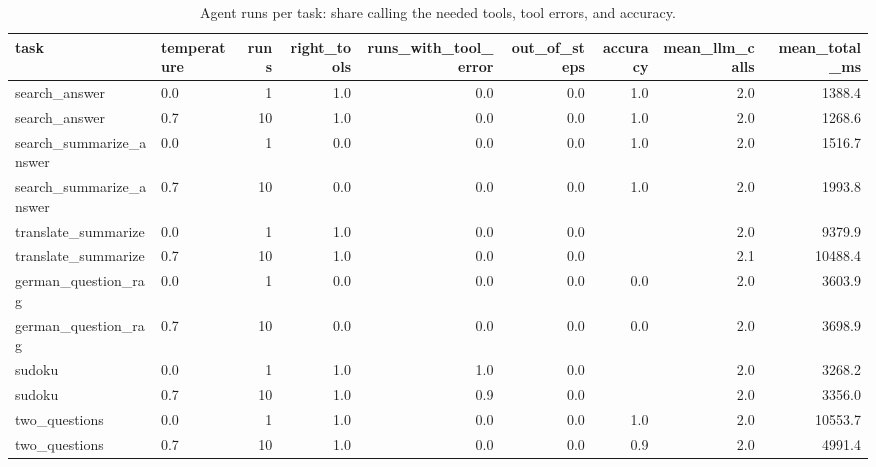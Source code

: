 \begin{table}[t]
\centering\small
\caption{Agent runs per task: share calling the needed tools, tool errors, and accuracy.}
\label{tab:agent_reliability}
\begin{tabular}{llrrrrrrr}
\toprule
task & temperature & runs & right\_tools & runs\_with\_tool\_error & out\_of\_steps & accuracy & mean\_llm\_calls & mean\_total\_ms \\
\midrule
search\_answer & 0.0 & 1 & 1.0 & 0.0 & 0.0 & 1.0 & 2.0 & 1388.4 \\
search\_answer & 0.7 & 10 & 1.0 & 0.0 & 0.0 & 1.0 & 2.0 & 1268.6 \\
search\_summarize\_answer & 0.0 & 1 & 0.0 & 0.0 & 0.0 & 1.0 & 2.0 & 1516.7 \\
search\_summarize\_answer & 0.7 & 10 & 0.0 & 0.0 & 0.0 & 1.0 & 2.0 & 1993.8 \\
translate\_summarize & 0.0 & 1 & 1.0 & 0.0 & 0.0 &  & 2.0 & 9379.9 \\
translate\_summarize & 0.7 & 10 & 1.0 & 0.0 & 0.0 &  & 2.1 & 10488.4 \\
german\_question\_rag & 0.0 & 1 & 0.0 & 0.0 & 0.0 & 0.0 & 2.0 & 3603.9 \\
german\_question\_rag & 0.7 & 10 & 0.0 & 0.0 & 0.0 & 0.0 & 2.0 & 3698.9 \\
sudoku & 0.0 & 1 & 1.0 & 1.0 & 0.0 &  & 2.0 & 3268.2 \\
sudoku & 0.7 & 10 & 1.0 & 0.9 & 0.0 &  & 2.0 & 3356.0 \\
two\_questions & 0.0 & 1 & 1.0 & 0.0 & 0.0 & 1.0 & 2.0 & 10553.7 \\
two\_questions & 0.7 & 10 & 1.0 & 0.0 & 0.0 & 0.9 & 2.0 & 4991.4 \\
\bottomrule
\end{tabular}
\end{table}
